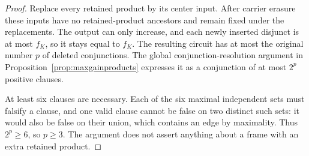 \documentclass[11pt]{article}
\theoremstyle{definition}
\theoremstyle{remark}
\begin{document}
\begin{proof}
Replace every retained product by its center input. After carrier erasure these inputs have no retained-product ancestors and remain fixed under the replacements. The output can only increase, and each newly inserted disjunct is at most $f_K$, so it stays equal to $f_K$. The resulting circuit has at most the original number $p$ of deleted conjunctions. The global conjunction-resolution argument in Proposition~\ref{prop:maxgainproducts} expresses it as a conjunction of at most $2^p$ positive clauses.

At least six clauses are necessary. Each of the six maximal independent sets must falsify a clause, and one valid clause cannot be false on two distinct such sets: it would also be false on their union, which contains an edge by maximality. Thus $2^p\ge6$, so $p\ge3$. The argument does not assert anything about a frame with an extra retained product.
\end{proof}
\end{document}
